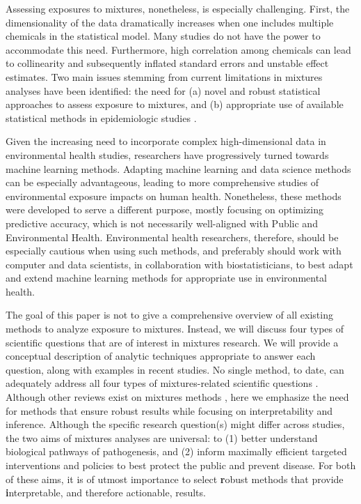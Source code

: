 Assessing exposures to mixtures, nonetheless, is especially challenging. First, the dimensionality of the data dramatically increases when one includes multiple chemicals in the statistical model. Many studies do not have the power to accommodate this need. Furthermore, high correlation among chemicals can lead to collinearity and subsequently inflated standard errors and unstable effect estimates. Two main issues stemming from current limitations in mixtures analyses have been identified: the need for (a) novel and robust statistical approaches to assess exposure to mixtures, and (b) appropriate use of available statistical methods in epidemiologic studies \cite{taylor16}.

Given the increasing need to incorporate complex high-dimensional data in environmental health studies, researchers have progressively turned towards machine learning methods. Adapting machine learning and data science methods can be especially advantageous, leading to more comprehensive studies of environmental exposure impacts on human health. Nonetheless, these methods were developed to serve a different purpose, mostly focusing on optimizing predictive accuracy, which is not necessarily well-aligned with Public and Environmental Health. Environmental health researchers, therefore, should be especially cautious when using such methods, and preferably should work with computer and data scientists, in collaboration with biostatisticians, to best adapt and extend machine learning methods for appropriate use in environmental health. 

The goal of this paper is not to give a comprehensive overview of all existing methods to analyze exposure to mixtures. Instead, we will discuss four types of scientific questions that are of interest in mixtures research. We will provide a conceptual description of analytic techniques appropriate to answer each question, along with examples in recent studies. No single method, to date, can adequately address all four types of mixtures-related scientific questions \cite{taylor16}. Although other reviews exist on mixtures methods \cite{hamra2018environmental, stafoggia2017statistical, huang2018cumulative, coker2018multi}, here we emphasize the need for methods that ensure robust results while focusing on interpretability and inference. Although the specific research question(s) might differ across studies, the two aims of mixtures analyses are universal: to (1) better understand biological pathways of pathogenesis, and (2) inform maximally efficient targeted interventions and policies to best protect the public and prevent disease. For both of these aims, it is of utmost importance to select {\textbf robust} methods that provide {\textbf interpretable}, and therefore actionable, results.

